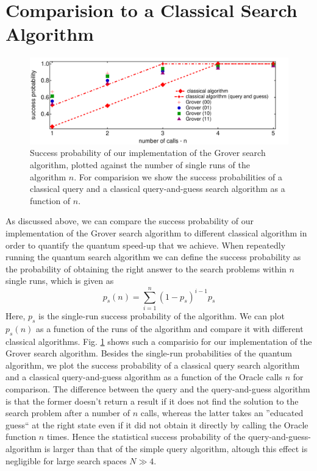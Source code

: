 \section{Comparision to a Classical Search Algorithm}

\begin{figure}[h!]
	\centering
	\includegraphics[width=1\textwidth]{"./material/mathematica/comparision_grover_classical"}
	\caption[]{Success probability of our implementation of the Grover search algorithm, plotted against the number of single runs of the algorithm $n$. For comparision we show the success probabilities of a classical query and a classical query-and-guess search algorithm as a function of $n$.}
	\label{fig:comparision_grover_classical}
\end{figure}

As discussed above, we can compare the success probability of our implementation of the Grover search algorithm to different classical algorithm in order to quantify the quantum speed-up that we achieve. When repeatedly running the quantum search algorithm we can define the success probability as the probability of obtaining the right answer to the search problems within $n$ single runs, which is given as
%
\begin{equation}
p_s(n) = \sum\limits_{i=1}^n (1-p_s)^{i-1}p_s
\end{equation}
%
Here, $p_s$ is the single-run success probability of the algorithm. We can plot $p_s(n)$ as a function of the runs of the algorithm and compare it with different classical algorithms. Fig. \ref{fig:comparision_grover_classical} shows such a comparisio for our implementation of the Grover search algorithm. Besides the single-run probabilities of the quantum algorithm, we plot the success probability of a classical query search algorithm and a classical query-and-guess algorithm as a function of the Oracle calls $n$ for comparison. The difference between the query and the query-and-guess algorithm is that the former doesn't return a result if it does not find the solution to the search problem after a number of $n$ calls, whereas the latter takes an ''educated guess`` at the right state even if it did not obtain it directly by calling the Oracle function $n$ times. Hence the statistical success probability of the query-and-guess-algorithm is larger than that of the simple query algorithm, altough this effect is negligible for large search spaces $N\gg 4$.

